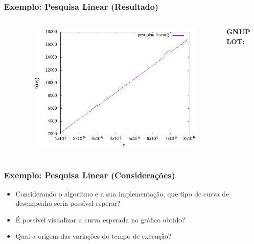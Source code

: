 \documentclass[aspectratio=169]{beamer}
\begin{document}
\begin{frame}[fragile]\frametitle{Exemplo: Pesquisa Linear (Resultado)}
\vspace{-5mm}
\begin{columns}[T]
\begin{column}{0.1\linewidth}{\tiny

}
\end{column}
\begin{column}{0.55\linewidth}
\begin{figure}[h]
	\centering
	\includegraphics[height=0.65\paperheight]{pesquisa_linear/grafico.jpg}
\end{figure}
\end{column}
\begin{column}{0.35\linewidth}
\vspace{5mm}
{\fontsize{0}{4}\selectfont{}\textbf{GNUPLOT:}

}
\end{column}
\end{columns}
\end{frame}

\begin{frame}[fragile]\frametitle{Exemplo: Pesquisa Linear (Considerações)}
\begin{itemize}
	\item Considerando o algoritmo e a sua implementação, que tipo de curva de desempenho seria possível esperar?
	\item É possível visualizar a curva esperada no gráfico obtido?
	\item Qual a origem das variações do tempo de execução?
\end{itemize}
\end{frame}
\end{document}
